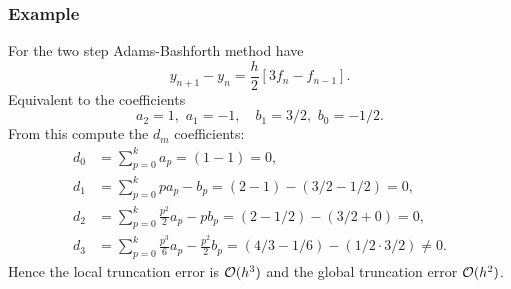 \documentclass{beamer}
\begin{document}
\begin{frame}
  \frametitle{Example}

  \begin{overlayarea}{\textwidth}{0.8\textheight}
    {
      For the two step Adams-Bashforth method have
    }
    {
      \begin{equation*}
        y_{n+1} - y_n = \frac{h}{2} \left[ 3 f_n - f_{n-1} \right].
      \end{equation*}
    }
    {
      Equivalent to the coefficients
    }
    {
      \begin{equation*}
        a_2 = 1, \,\, a_1 = -1, \quad b_1 = 3/2, \,\, b_0 = -1/2.
      \end{equation*}
    }
    {
      From this compute the $d_m$ coefficients:
      \begin{align*}
        d_0 & = \textstyle\sum_{p=0}^k a_p = (1 - 1) = 0, \\
        d_1 & = \textstyle\sum_{p=0}^k p a_p - b_p = \left(2 - 1
        \right) - \left( 3/2 - 1/2 \right) = 0, \\
        d_2 & = \textstyle\sum_{p=0}^k \tfrac{p^2}{2} a_p - p b_p =
        \left( 2 - 1/2 \right) - \left( 3/2 + 0 \right) = 0, \\
        d_3 & = \textstyle\sum_{p=0}^k \tfrac{p^3}{6} a_p -
        \tfrac{p^2}{2} b_p = \left( 4/3 - 1/6 \right) - \left( 1/2 \cdot
          3/2 \right) \neq 0.
      \end{align*}
    }
    {
      Hence the local truncation error is ${\cal O}(h^3)$ and the
      global truncation error ${\cal O}(h^2)$.
    }
  \end{overlayarea}
\end{frame}
\end{document}
